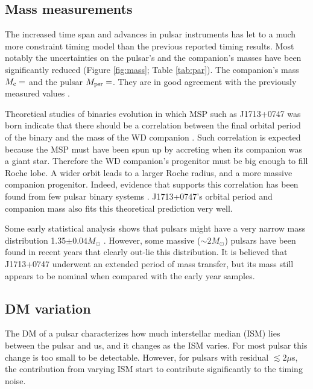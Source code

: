 \subsection{Mass measurements}
\label{sec:mass}
The increased time span and advances in pulsar instruments has let to a much
more constraint timing model than the previous reported timing results. Most
notably the uncertainties on the pulsar's and the companion's masses have been
significantly reduced (Figure \ref{fig:mass}; Table \ref{tab:par}). The
companion's mass $M_{\rm c} = $ and the pulsar $M_{\rm psr}=$. They are in
good agreement with the previously measured values \cite{sns+05}.

Theoretical studies of binaries evolution in which MSP such as J1713+0747 was born  
indicate that there should be a correlation between the final orbital period
of the binary and the mass of the WD companion \citep{rpj+95, ts99a, prp02b}
. Such correlation is expected because the MSP must have been spun up by
accreting when its companion was a giant star. Therefore the WD
companion's progenitor must be big enough to fill Roche lobe. A wider
orbit leads to a larger Roche radius, and a more massive companion progenitor.
Indeed, evidence that supports this correlation has been found from few pulsar
binary systems \citep{vbb+01, ktr94}.  
J1713+0747's orbital period and companion mass also fits this theoretical
prediction very well.

Some early statistical analysis shows that pulsars 
might have a very narrow mass distribution 1.35$\pm0.04M_{\odot}$ \citep{tc99}. 
However, some massive ($\sim2M_{\odot}$) pulsars have been found in recent
years \citep{dpr+10, fbw+11, afw+13} that clearly out-lie this distribution.
It is believed that  J1713+0747 underwent an extended period of mass transfer,
but its mass still appears to be nominal when compared with the early year samples.


\subsection{DM variation}
\label{sec:dmx}
The DM of a pulsar characterizes how much interstellar median (ISM) lies
between the pulsar and us, and it changes as the ISM varies. For most pulsar
this change is too small to be detectable. However, for pulsars with residual
$\lesssim2\mu$s, the contribution from varying ISM start to contribute
significantly to the timing noise. 


